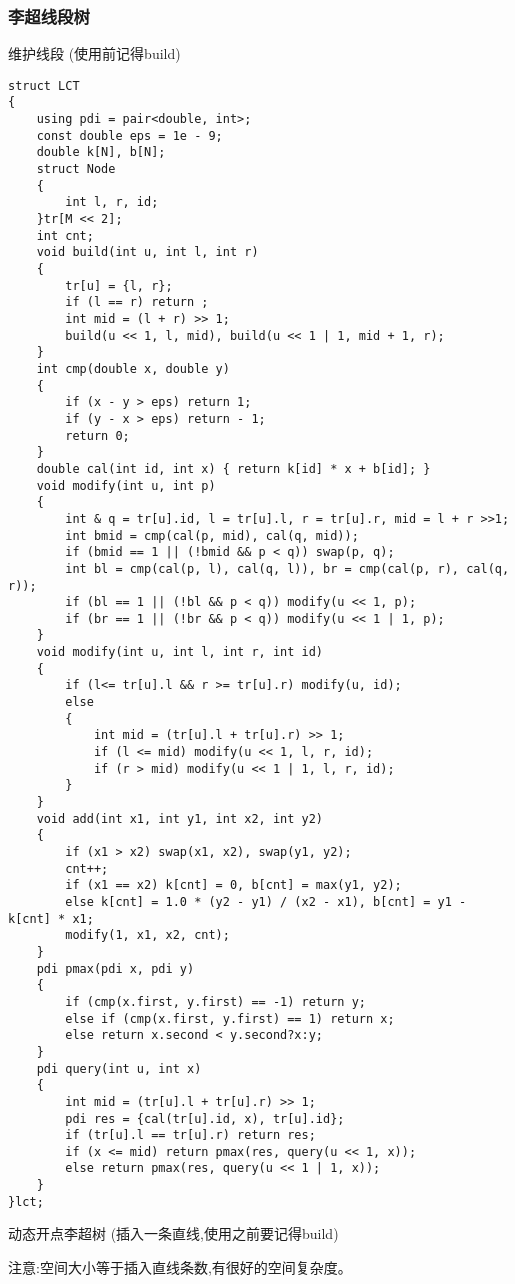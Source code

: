 \documentclass[a4paper, fontset=none]{ctexart}
\begin{document}
\subsubsection{李超线段树}
维护线段 (使用前记得build)
\begin{verbatim}
struct LCT
{
    using pdi = pair<double, int>;
    const double eps = 1e - 9;
    double k[N], b[N];
    struct Node
    {
        int l, r, id;
    }tr[M << 2];
    int cnt;
    void build(int u, int l, int r)
    {
        tr[u] = {l, r};
        if (l == r) return ;
        int mid = (l + r) >> 1;
        build(u << 1, l, mid), build(u << 1 | 1, mid + 1, r);
    }
    int cmp(double x, double y)
    {
        if (x - y > eps) return 1;
        if (y - x > eps) return - 1;
        return 0;
    }
    double cal(int id, int x) { return k[id] * x + b[id]; }
    void modify(int u, int p)
    {
        int & q = tr[u].id, l = tr[u].l, r = tr[u].r, mid = l + r >>1;
        int bmid = cmp(cal(p, mid), cal(q, mid));
        if (bmid == 1 || (!bmid && p < q)) swap(p, q);
        int bl = cmp(cal(p, l), cal(q, l)), br = cmp(cal(p, r), cal(q, r));
        if (bl == 1 || (!bl && p < q)) modify(u << 1, p);
        if (br == 1 || (!br && p < q)) modify(u << 1 | 1, p);
    }
    void modify(int u, int l, int r, int id)
    {
        if (l<= tr[u].l && r >= tr[u].r) modify(u, id);
        else
        {
            int mid = (tr[u].l + tr[u].r) >> 1;
            if (l <= mid) modify(u << 1, l, r, id);
            if (r > mid) modify(u << 1 | 1, l, r, id);
        }
    }
    void add(int x1, int y1, int x2, int y2)
    {
        if (x1 > x2) swap(x1, x2), swap(y1, y2);
        cnt++;
        if (x1 == x2) k[cnt] = 0, b[cnt] = max(y1, y2);
        else k[cnt] = 1.0 * (y2 - y1) / (x2 - x1), b[cnt] = y1 - k[cnt] * x1;
        modify(1, x1, x2, cnt);
    }
    pdi pmax(pdi x, pdi y)
    {
        if (cmp(x.first, y.first) == -1) return y;
        else if (cmp(x.first, y.first) == 1) return x;
        else return x.second < y.second?x:y;
    }
    pdi query(int u, int x)
    {
        int mid = (tr[u].l + tr[u].r) >> 1;
        pdi res = {cal(tr[u].id, x), tr[u].id};
        if (tr[u].l == tr[u].r) return res;
        if (x <= mid) return pmax(res, query(u << 1, x));
        else return pmax(res, query(u << 1 | 1, x));
    }
}lct;
\end{verbatim}

动态开点李超树 (插入一条直线,使用之前要记得build)

注意:空间大小等于插入直线条数,有很好的空间复杂度。
\end{document}
